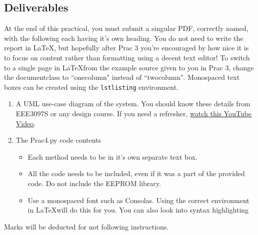 \subsection{Deliverables}
At the end of this practical, you must submit a singular PDF, correctly named, with the following each having it's own heading. You do not need to write the report in \LaTeX, but hopefully after Prac 3 you're encouraged by how nice it is to focus on content rather than formatting using a decent text editor! To switch to a single page in \LaTeX from the example source given to you in Prac 3, change the documentclass to ``onecolumn" instead of ``twocolumn". Monospaced text boxes can be created using the \verb|lstlisting| environment.
\begin{enumerate}
    \item A UML use-case diagram of the system. You should know these details from EEE3097S or any design course. If you need a refresher, \href{https://www.youtube.com/watch?v=zid-MVo7M-E}{watch this YouTube Video}.
    \item The Prac4.py code contents
    \begin{itemize}
        \item Each method needs to be in it's own separate text box. 
        \item All the code needs to be included, even if it was a part of the provided code. Do not include the EEPROM library.
        \item Use a monospaced font such as Consolas. Using the correct environment in \LaTeX will do this for you. You can also look into syntax highlighting
    \end{itemize}
\end{enumerate}

Marks will be deducted for not following instructions.